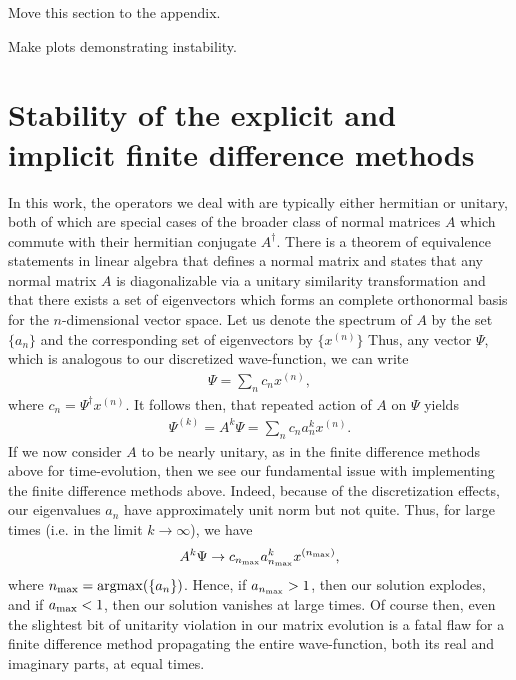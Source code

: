 {\color{red} 
    Move this section to the appendix.

    Make plots demonstrating instability.
}


\section{Stability of the explicit and implicit finite difference methods}
\label{app:stability-of-the-explicity-and-implicit-finite-difference-methods}

In this work, the operators we deal with are typically either hermitian or unitary, both of which are special cases of the broader class of normal matrices $A$ which commute with their hermitian conjugate $A^{\dagger}$.
There is a theorem of equivalence statements in linear algebra that defines a normal matrix and states that any normal matrix $A$ is diagonalizable via a unitary similarity transformation and that there exists a set of eigenvectors which forms an complete orthonormal basis for the $n$-dimensional vector space.
Let us denote the spectrum of $A$ by the set $\{ a_{n} \}$ and the corresponding set of eigenvectors by $\{ x^{(n)} \}$
Thus, any vector $\Psi$, which is analogous to our discretized wave-function, we can write
\begin{align}
    \Psi = \sum_{n} c_{n} x^{(n)}
,\end{align}
where $c_{n} = \Psi^{\dagger} x^{(n)}$.
It follows then, that repeated action of $A$ on $\Psi$ yields
\begin{align}
    \Psi^{(k)} = A^{k} \Psi = \sum_{n} c_{n} a_{n}^{k} x^{(n)}
.\end{align}
If we now consider $A$ to be nearly unitary, as in the finite difference methods above for time-evolution, then we see our fundamental issue with implementing the finite difference methods above.
Indeed, because of the discretization effects, our eigenvalues $a_{n}$ have approximately unit norm but not quite.
Thus, for large times (i.e. in the limit $k \rightarrow \infty$), we have
\begin{align}
    A^{k} \Psi \rightarrow c_{n_{\rm max}} a_{n_{\rm max}}^{k} x^{(n_{\rm max})}
,\end{align}
where $n_{\rm max} = {\rm argmax}(\{ a_{n} \})$.
Hence, if $a_{n_{\rm max}} > 1$, then our solution explodes, and if $a_{\rm max} < 1$, then our solution vanishes at large times.
Of course then, even the slightest bit of unitarity violation in our matrix evolution is a fatal flaw for a finite difference method propagating the entire wave-function, both its real and imaginary parts, at equal times.

